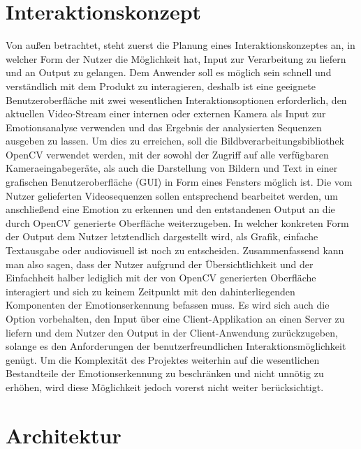 \documentclass[12pt, a4paper]{scrbook}
\begin{document}
\section{Interaktionskonzept}
Von außen betrachtet, steht zuerst die Planung eines Interaktionskonzeptes an, in welcher Form der Nutzer die Möglichkeit hat, Input zur Verarbeitung zu liefern und an Output zu gelangen. Dem Anwender soll es möglich sein schnell und verständlich mit dem Produkt zu interagieren, deshalb ist eine geeignete Benutzeroberfläche mit zwei wesentlichen Interaktionsoptionen erforderlich, den aktuellen Video-Stream einer internen oder externen Kamera als Input zur Emotionsanalyse verwenden und das Ergebnis der analysierten Sequenzen ausgeben zu lassen. Um dies zu erreichen, soll die Bildbverarbeitungsbibliothek OpenCV verwendet werden, mit der sowohl der Zugriff auf alle verfügbaren Kameraeingabegeräte, als auch die Darstellung von Bildern und Text in einer grafischen Benutzeroberfläche (GUI) in Form eines Fensters möglich ist. Die vom Nutzer gelieferten Videosequenzen sollen entsprechend bearbeitet werden, um anschließend eine Emotion zu erkennen und den entstandenen Output an die durch OpenCV generierte Oberfläche weiterzugeben. In welcher konkreten Form der Output dem Nutzer letztendlich dargestellt wird, als Grafik, einfache Textausgabe oder audiovisuell ist noch zu entscheiden.\newline
Zusammenfassend kann man also sagen, dass der Nutzer aufgrund der Übersichtlichkeit und der Einfachheit halber lediglich mit der von OpenCV generierten Oberfläche interagiert und sich zu keinem Zeitpunkt mit den dahinterliegenden Komponenten der Emotionserkennung befassen muss.\newline
Es wird sich auch die Option vorbehalten, den Input über eine Client-Applikation an einen Server zu liefern und dem Nutzer den Output in der Client-Anwendung zurückzugeben, solange es den Anforderungen der benutzerfreundlichen Interaktionsmöglichkeit genügt. Um die Komplexität des Projektes weiterhin auf die wesentlichen Bestandteile der Emotionserkennung zu beschränken und nicht unnötig zu erhöhen, wird diese Möglichkeit jedoch vorerst nicht weiter berücksichtigt.

\section{Architektur}
\end{document}
